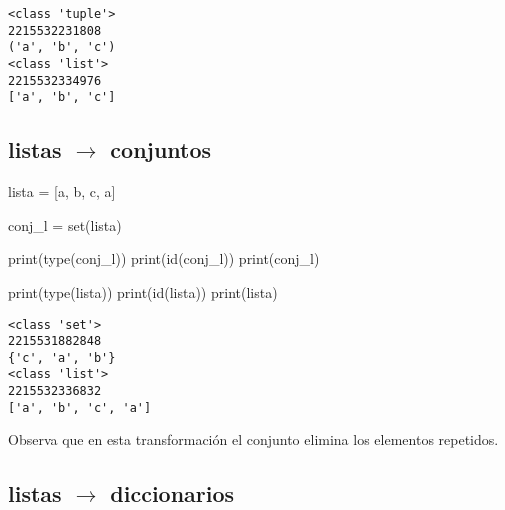 \documentclass[
  letterpaper,
  DIV=11,
  numbers=noendperiod]{scrreprt}
\newenvironment{Shaded}{\begin{snugshade}}{\end{snugshade}}
\newcommand{\BuiltInTok}[1]{\textcolor[rgb]{0.00,0.23,0.31}{#1}}
\newcommand{\NormalTok}[1]{\textcolor[rgb]{0.00,0.23,0.31}{#1}}
\newcommand{\OperatorTok}[1]{\textcolor[rgb]{0.37,0.37,0.37}{#1}}
\newcommand{\StringTok}[1]{\textcolor[rgb]{0.13,0.47,0.30}{#1}}
\begin{document}
\begin{verbatim}
<class 'tuple'>
2215532231808
('a', 'b', 'c')
<class 'list'>
2215532334976
['a', 'b', 'c']
\end{verbatim}

\subsection{\texorpdfstring{listas \(\to\)
conjuntos}{listas \textbackslash to conjuntos}}\label{listas-to-conjuntos}

\begin{Shaded}
\begin{Highlighting}[]
\NormalTok{lista }\OperatorTok{=}\NormalTok{ [}\StringTok{\textquotesingle{}a\textquotesingle{}}\NormalTok{, }\StringTok{\textquotesingle{}b\textquotesingle{}}\NormalTok{, }\StringTok{\textquotesingle{}c\textquotesingle{}}\NormalTok{, }\StringTok{\textquotesingle{}a\textquotesingle{}}\NormalTok{]}
\end{Highlighting}
\end{Shaded}

\begin{Shaded}
\begin{Highlighting}[]
\NormalTok{conj\_l }\OperatorTok{=} \BuiltInTok{set}\NormalTok{(lista)}

\BuiltInTok{print}\NormalTok{(}\BuiltInTok{type}\NormalTok{(conj\_l))}
\BuiltInTok{print}\NormalTok{(}\BuiltInTok{id}\NormalTok{(conj\_l))}
\BuiltInTok{print}\NormalTok{(conj\_l)}

\BuiltInTok{print}\NormalTok{(}\BuiltInTok{type}\NormalTok{(lista))}
\BuiltInTok{print}\NormalTok{(}\BuiltInTok{id}\NormalTok{(lista))}
\BuiltInTok{print}\NormalTok{(lista)}
\end{Highlighting}
\end{Shaded}

\begin{verbatim}
<class 'set'>
2215531882848
{'c', 'a', 'b'}
<class 'list'>
2215532336832
['a', 'b', 'c', 'a']
\end{verbatim}

Observa que en esta transformación el conjunto elimina los elementos
repetidos.

\subsection{\texorpdfstring{listas \(\to\)
diccionarios}{listas \textbackslash to diccionarios}}\label{listas-to-diccionarios}
\end{document}

